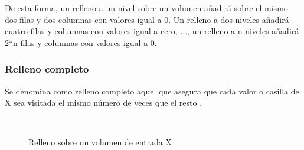 De esta forma, un relleno a un nivel sobre un volumen añadirá sobre el mismo dos filas y dos columnas con valores igual a 0. Un relleno a dos niveles añadirá cuatro filas y columnas con valores igual a cero, ..., un relleno a n niveles añadirá 2*n filas y columnas con valores igual a 0.

\subsubsection{Relleno completo}

Se denomina como relleno completo aquel que asegura que cada valor o casilla de X sea visitada el mismo número de veces que el resto \cite{padding_2}.

\begin{figure}[H]
	\centering
	\hfill
	\\
	\hfill
	\hfill
	
	\caption{Relleno sobre un volumen de entrada X}
\end{figure}

